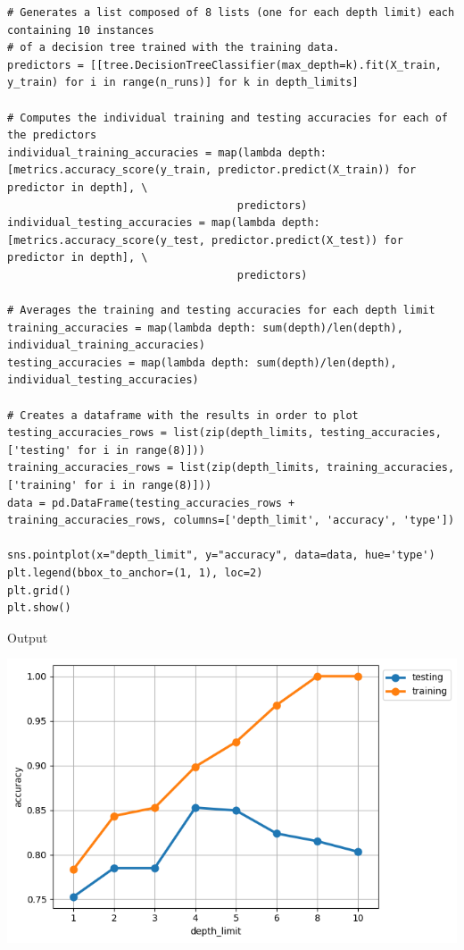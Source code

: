 \documentclass[12pt]{article}
\begin{document}
\begin{enumerate}
\begin{lstlisting}[basicstyle=\tiny]
# Generates a list composed of 8 lists (one for each depth limit) each containing 10 instances
# of a decision tree trained with the training data.
predictors = [[tree.DecisionTreeClassifier(max_depth=k).fit(X_train, y_train) for i in range(n_runs)] for k in depth_limits]

# Computes the individual training and testing accuracies for each of the predictors
individual_training_accuracies = map(lambda depth: [metrics.accuracy_score(y_train, predictor.predict(X_train)) for predictor in depth], \
                                    predictors)
individual_testing_accuracies = map(lambda depth: [metrics.accuracy_score(y_test, predictor.predict(X_test)) for predictor in depth], \
                                    predictors)

# Averages the training and testing accuracies for each depth limit
training_accuracies = map(lambda depth: sum(depth)/len(depth), individual_training_accuracies)
testing_accuracies = map(lambda depth: sum(depth)/len(depth), individual_testing_accuracies)

# Creates a dataframe with the results in order to plot
testing_accuracies_rows = list(zip(depth_limits, testing_accuracies, ['testing' for i in range(8)]))
training_accuracies_rows = list(zip(depth_limits, training_accuracies, ['training' for i in range(8)]))
data = pd.DataFrame(testing_accuracies_rows + training_accuracies_rows, columns=['depth_limit', 'accuracy', 'type'])

sns.pointplot(x="depth_limit", y="accuracy", data=data, hue='type')
plt.legend(bbox_to_anchor=(1, 1), loc=2)  
plt.grid()
plt.show()
    \end{lstlisting}

    Output

    \begin{center}
        \includegraphics[scale=0.6]{images/plot3.png}
    \end{center}


\end{enumerate}
\end{document}

